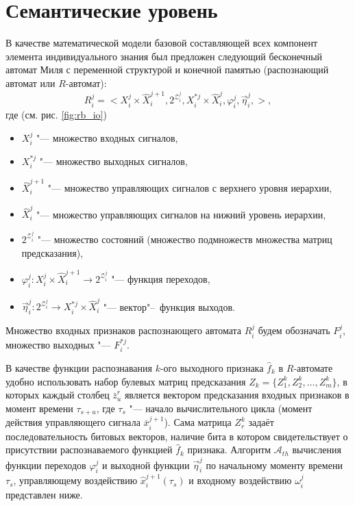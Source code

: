 \documentclass[a4paper, 12pt]{article}
\theoremstyle{plain}
\begin{document}
	
	\section{Семантические уровень}
	В качестве математической модели базовой составляющей всех компонент элемента индивидуального знания был предложен следующий бесконечный автомат Миля с переменной структурой и конечной памятью (распознающий автомат или $R$-автомат):  
	\begin{equation}
		R_i^j=<X_i^j\times \hat{X}_i^{j+1}, 2^{\mathcal Z_i^j}, X_i^{*j}\times \hat{X}_i^j,\varphi_i^j,\vec\eta_i^j,>,
	\end{equation}
	где (см. рис. \ref{fig:rb_io})
	\begin{itemize}
		\item $X_i^j$ "--- множество входных сигналов, 
		\item $X_i^{*j}$ "--- множество выходных сигналов, 
		\item $\hat{X}_i^{j+1}$ "--- множество управляющих сигналов с верхнего уровня иерархии,
		\item $\hat{X}_i^j$ "--- множество управляющих сигналов на нижний уровень иерархии,
		\item $2^{\mathcal Z_i^j}$ "--- множество состояний (множество подмножеств множества матриц предсказания),
		\item $\varphi_i^j:X_i^j\times \hat{X}_i^{j+1}\to 2^{\mathcal Z_i^j}$ "--- функция переходов,
		\item $\vec\eta_i^j:2^{\mathcal Z_i^j} \to X_i^{*j}\times \hat{X}_i^j$ "--- вектор"--~функция выходов.
	\end{itemize}
	Множество входных признаков распознающего автомата $R_i^j$ будем обозначать $F_i^j$, множество выходных "--- $F_i^{*j}$.
	
	В качестве функции распознавания $k$-ого выходного признака $\hat f_k$ в $R$-автомате удобно использовать набор булевых матриц предсказания $Z_k=\{Z_1^k,Z_2^k,\dots,Z_m^k\}$, в которых каждый столбец $\bar z_u^r$ является вектором предсказания входных признаков в момент времени $\tau_{s+u}$, где $\tau_s$ "--- начало вычислительного цикла (момент действия управляющего сигнала $\bar x_i^{j+1}$). Сама матрица $Z_r^k$ задаёт последовательность битовых векторов, наличие бита в котором свидетельствует о присутствии распознаваемого функцией $\hat f_k$ признака. Алгоритм $\mathcal A_{th}$ вычисления функции переходов $\varphi_i^j$ и выходной функции $\vec\eta_i^j$ по начальному моменту времени $\tau_s$, управляющему воздействию $\hat x_i^{j+1}(\tau_s)$ и входному воздействию $\omega_i^j$ представлен ниже.
	
\end{document}
